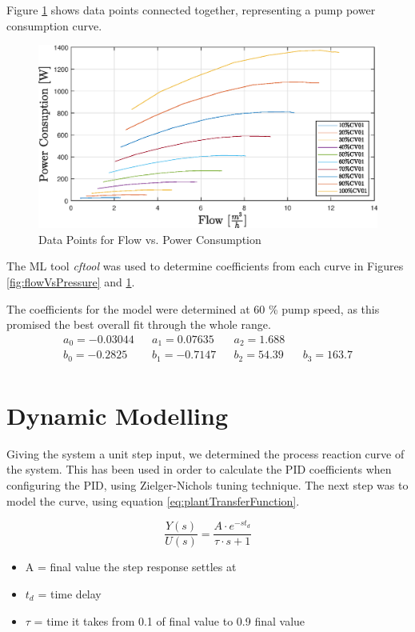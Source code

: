 \newpage
Figure \ref{fig:flowVsPowerConsumption} shows data points connected together, representing a pump
power consumption curve.

\begin{figure}[ht]
	\centering
	\includegraphics[width=1\textwidth]{figures/05mathematicalModelling/flowVsPowerRun34.eps}
	\caption{Data Points for Flow vs. Power Consumption}
	\label{fig:flowVsPowerConsumption}
\end{figure}

The ML tool \textit{cftool} \cite{cftool} was used to determine coefficients from each curve in  Figures 
\ref{fig:flowVsPressure} and \ref{fig:flowVsPowerConsumption}.

The coefficients for the model were determined at 60 \% pump speed, 
as this promised the best overall fit through the whole range.
\begin{align*}
	a_0 = -0.03044 && a_1 = 0.07635  && a_2 = 1.688  \\
	b_0 = -0.2825 && b_1 = -0.7147 && b_2 = 54.39 && b_3 = 163.7 \\
\end{align*}
\newpage
\section{Dynamic Modelling}\label{sec:dynMod}
Giving the system a unit step input, we determined the process reaction curve of the system. This has been used 
in order to calculate the PID coefficients when configuring the PID, using Zielger-Nichols tuning technique.
The next step was to model the curve, using equation \ref{eq:plantTransferFunction}.

\begin{equation}
	\frac{Y(s)}{U(s)} = \frac{A \cdot e^{-st_d}}{\tau \cdot s + 1}
	\label{eq:plantTransferFunction}
\end{equation}
\cite{Franklin2014}
\begin{itemize}
	\item A = final value the step response settles at
	\item $t_{d}$ = time delay
	\item $\tau$ = time it takes from 0.1 of final value to 0.9 final value
\end{itemize}

